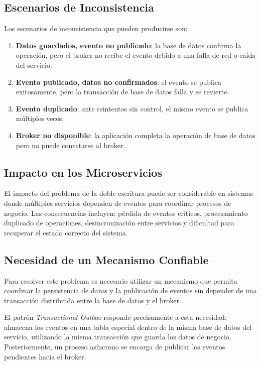\subsection{Escenarios de Inconsistencia}

Los escenarios de inconsistencia que pueden producirse son:

\begin{enumerate}
    \item \textbf{Datos guardados, evento no publicado}: la base de datos confirma la operación, pero el broker no recibe el evento debido a una falla de red o caída del servicio.
    \item \textbf{Evento publicado, datos no confirmados}: el evento se publica exitosamente, pero la transacción de base de datos falla y se revierte.
    \item \textbf{Evento duplicado}: ante reintentos sin control, el mismo evento se publica múltiples veces.
    \item \textbf{Broker no disponible}: la aplicación completa la operación de base de datos pero no puede conectarse al broker.
\end{enumerate}

\subsection{Impacto en los Microservicios}

El impacto del problema de la doble escritura puede ser considerable en sistemas donde múltiples servicios dependen de eventos para coordinar procesos de negocio. Las consecuencias incluyen: pérdida de eventos críticos, procesamiento duplicado de operaciones, desincronización entre servicios y dificultad para recuperar el estado correcto del sistema.

\subsection{Necesidad de un Mecanismo Confiable}

Para resolver este problema es necesario utilizar un mecanismo que permita coordinar la persistencia de datos y la publicación de eventos sin depender de una transacción distribuida entre la base de datos y el broker.

El patrón \textit{Transactional Outbox} responde precisamente a esta necesidad: almacena los eventos en una tabla especial dentro de la misma base de datos del servicio, utilizando la misma transacción que guarda los datos de negocio. Posteriormente, un proceso asíncrono se encarga de publicar los eventos pendientes hacia el broker.

